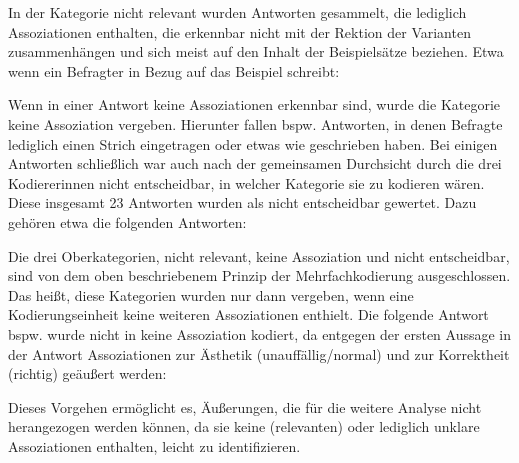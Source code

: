 In der Kategorie \glqq nicht relevant\grqq{} wurden Antworten gesammelt, die lediglich Assoziationen enthalten, die erkennbar nicht mit der Rektion der Varianten zusammenhängen und sich meist auf den Inhalt der Beispielsätze beziehen. 
Etwa wenn ein Befragter in Bezug auf das Beispiel  schreibt: 
\begin{exe}
\ex {}
\end{exe}
Wenn in einer Antwort keine Assoziationen erkennbar sind, wurde die Kategorie \glqq keine Assoziation\grqq{} vergeben. 
Hierunter fallen bspw. Antworten, in denen Befragte lediglich einen Strich eingetragen oder etwas wie  geschrieben haben. 
Bei einigen Antworten schließlich war auch nach der gemeinsamen Durchsicht durch die drei Kodiererinnen nicht entscheidbar, in welcher Kategorie sie zu kodieren wären. 
Diese insgesamt 23 Antworten wurden als \glqq nicht entscheidbar\grqq{} gewertet. 
Dazu gehören etwa die folgenden Antworten:
\begin{exe}
\ex {}
\ex {}
\end{exe} 
Die drei Oberkategorien, \glqq nicht relevant\grqq, \glqq keine Assoziation\grqq{} und \glqq nicht entscheidbar\grqq, sind von dem oben beschriebenem Prinzip der Mehrfachkodierung ausgeschlossen. 
Das heißt, diese Kategorien wurden nur dann vergeben, wenn eine Kodierungseinheit keine weiteren Assoziationen enthielt.
Die folgende Antwort bspw. wurde nicht in \glqq keine Assoziation\grqq{} kodiert, da entgegen der ersten Aussage in der Antwort Assoziationen zur Ästhetik (\glqq unauffällig/normal\grqq) und zur Korrektheit (\glqq richtig\grqq) geäußert werden: 
\begin{exe}
\ex {}
\end{exe} 
Dieses Vorgehen ermöglicht es, Äußerungen, die für die weitere Analyse nicht herangezogen werden können, da sie keine (relevanten) oder lediglich unklare Assoziationen enthalten, leicht zu identifizieren. 

